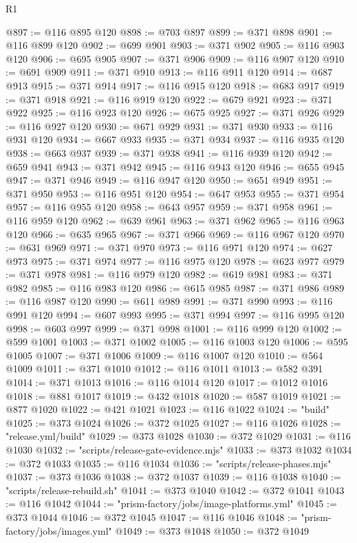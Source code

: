\begin{lexlean}{R1}
\begin{coremodule}
@897 := @116 @895 @120
@898 := @703 @897
@899 := @371 @898
@901 := @116 @899 @120
@902 := @699 @901
@903 := @371 @902
@905 := @116 @903 @120
@906 := @695 @905
@907 := @371 @906
@909 := @116 @907 @120
@910 := @691 @909
@911 := @371 @910
@913 := @116 @911 @120
@914 := @687 @913
@915 := @371 @914
@917 := @116 @915 @120
@918 := @683 @917
@919 := @371 @918
@921 := @116 @919 @120
@922 := @679 @921
@923 := @371 @922
@925 := @116 @923 @120
@926 := @675 @925
@927 := @371 @926
@929 := @116 @927 @120
@930 := @671 @929
@931 := @371 @930
@933 := @116 @931 @120
@934 := @667 @933
@935 := @371 @934
@937 := @116 @935 @120
@938 := @663 @937
@939 := @371 @938
@941 := @116 @939 @120
@942 := @659 @941
@943 := @371 @942
@945 := @116 @943 @120
@946 := @655 @945
@947 := @371 @946
@949 := @116 @947 @120
@950 := @651 @949
@951 := @371 @950
@953 := @116 @951 @120
@954 := @647 @953
@955 := @371 @954
@957 := @116 @955 @120
@958 := @643 @957
@959 := @371 @958
@961 := @116 @959 @120
@962 := @639 @961
@963 := @371 @962
@965 := @116 @963 @120
@966 := @635 @965
@967 := @371 @966
@969 := @116 @967 @120
@970 := @631 @969
@971 := @371 @970
@973 := @116 @971 @120
@974 := @627 @973
@975 := @371 @974
@977 := @116 @975 @120
@978 := @623 @977
@979 := @371 @978
@981 := @116 @979 @120
@982 := @619 @981
@983 := @371 @982
@985 := @116 @983 @120
@986 := @615 @985
@987 := @371 @986
@989 := @116 @987 @120
@990 := @611 @989
@991 := @371 @990
@993 := @116 @991 @120
@994 := @607 @993
@995 := @371 @994
@997 := @116 @995 @120
@998 := @603 @997
@999 := @371 @998
@1001 := @116 @999 @120
@1002 := @599 @1001
@1003 := @371 @1002
@1005 := @116 @1003 @120
@1006 := @595 @1005
@1007 := @371 @1006
@1009 := @116 @1007 @120
@1010 := @564 @1009
@1011 := @371 @1010
@1012 := @116 @1011
@1013 := @582 @391
@1014 := @371 @1013
@1016 := @116 @1014 @120
@1017 := @1012 @1016
@1018 := @881 @1017
@1019 := @432 @1018
@1020 := @587 @1019
@1021 := @877 @1020
@1022 := @421 @1021
@1023 := @116 @1022
@1024 := "build"
@1025 := @373 @1024
@1026 := @372 @1025
@1027 := @116 @1026
@1028 := "release.yml/build"
@1029 := @373 @1028
@1030 := @372 @1029
@1031 := @116 @1030
@1032 := "scripts/release-gate-evidence.mjs"
@1033 := @373 @1032
@1034 := @372 @1033
@1035 := @116 @1034
@1036 := "scripts/release-phases.mjs"
@1037 := @373 @1036
@1038 := @372 @1037
@1039 := @116 @1038
@1040 := "scripts/release-rebuild.sh"
@1041 := @373 @1040
@1042 := @372 @1041
@1043 := @116 @1042
@1044 := "prism-factory/jobs/image-platforms.yml"
@1045 := @373 @1044
@1046 := @372 @1045
@1047 := @116 @1046
@1048 := "prism-factory/jobs/images.yml"
@1049 := @373 @1048
@1050 := @372 @1049

\end{coremodule}
\end{lexlean}
